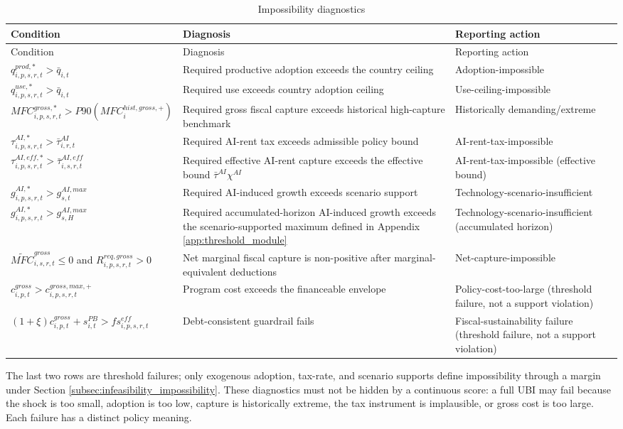 \documentclass[11pt,a4paper]{article}
\begin{document}
\begin{longtable}{p{}p{}p{}}
\caption{Impossibility diagnostics}\label{tab:impossibility_diagnostics_v10}\\
\toprule
Condition & Diagnosis & Reporting action \\
\midrule
\endfirsthead
\toprule
Condition & Diagnosis & Reporting action \\
\midrule
\endhead
$q^{prod,*}_{i,p,s,r,t}>\bar q_{i,t}$ & Required productive adoption exceeds the country ceiling & Adoption-impossible \\
$q^{use,*}_{i,p,s,r,t}>\bar q_{i,t}$ & Required use exceeds country adoption ceiling & Use-ceiling-impossible \\
$MFC^{gross,*}_{i,p,s,r,t}>P90(MFC^{hist,gross,+}_i)$ & Required gross fiscal capture exceeds historical high-capture benchmark & Historically demanding/extreme \\
$\tau^{AI,*}_{i,p,s,r,t}>\bar\tau^{AI}_{i,r,t}$ & Required AI-rent tax exceeds admissible policy bound & AI-rent-tax-impossible \\
$\tau^{AI,eff,*}_{i,p,s,r,t}>\bar\tau^{AI,eff}_{i,s,r,t}$ & Required effective AI-rent capture exceeds the effective bound $\bar\tau^{AI}\chi^{AI}$ & AI-rent-tax-impossible (effective bound) \\
$g^{AI,*}_{i,p,s,r,t}>g^{AI,max}_{s,t}$ & Required AI-induced growth exceeds scenario support & Technology-scenario-insufficient \\
$g^{AI,*}_{i,p,s,r,t}>g^{AI,max}_{s,H}$ & Required accumulated-horizon AI-induced growth exceeds the scenario-supported maximum defined in Appendix \ref{app:threshold_module} & Technology-scenario-insufficient (accumulated horizon) \\
$\widetilde{MFC}^{gross}_{i,s,r,t}\leq0$ and $R^{req,gross}_{i,p,s,r,t}>0$ & Net marginal fiscal capture is non-positive after marginal-equivalent deductions & Net-capture-impossible \\
$c^{gross}_{i,p,t}>c^{gross,max,+}_{i,p,s,r,t}$ & Program cost exceeds the financeable envelope & Policy-cost-too-large (threshold failure, not a support violation) \\
$(1+\xi)c^{gross}_{i,p,t}+s^{PB}_{i,t}>fs^{eff}_{i,p,s,r,t}$ & Debt-consistent guardrail fails & Fiscal-sustainability failure (threshold failure, not a support violation) \\
\bottomrule
\end{longtable}

The last two rows are threshold failures; only exogenous adoption, tax-rate, and scenario supports define impossibility through a margin under Section \ref{subsec:infeasibility_impossibility}. These diagnostics must not be hidden by a continuous score: a full UBI may fail because the shock is too small, adoption is too low, capture is historically extreme, the tax instrument is implausible, or gross cost is too large. Each failure has a distinct policy meaning.
\end{document}

